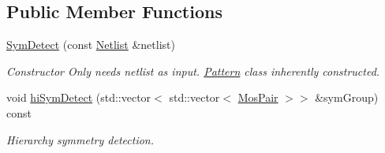 \subsection*{Public Member Functions}
\begin{DoxyCompactItemize}
\item 
\hyperlink{classSymDetect_aaf0ca6563b2168db22cfd313ec773c23}{Sym\+Detect} (const \hyperlink{classNetlist}{Netlist} \&netlist)
\begin{DoxyCompactList}\small\item\em Constructor Only needs netlist as input. \hyperlink{classPattern}{Pattern} class inherently constructed. \end{DoxyCompactList}\item 
void \hyperlink{classSymDetect_a81ec317ab0f508b3e0af483ef8a2c1ac}{hi\+Sym\+Detect} (std\+::vector$<$ std\+::vector$<$ \hyperlink{structMosPair}{Mos\+Pair} $>$$>$ \&sym\+Group) const
\begin{DoxyCompactList}\small\item\em Hierarchy symmetry detection. \end{DoxyCompactList}\end{DoxyCompactItemize}
